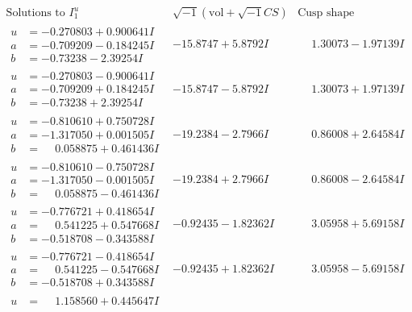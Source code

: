 \documentclass[1p]{elsarticle_modified}
\theoremstyle{definition}
\newcommand{\I}{\sqrt{-1}}
\begin{document}
$$\begin{array}{c|c|c}  
\text{Solutions to }I^u_{1}& \I (\text{vol} + \sqrt{-1}CS) & \text{Cusp shape}\\
 \hline 
\begin{aligned}
u &= -0.270803 + 0.900641 I \\
a &= -0.709209 - 0.184245 I \\
b &= -0.73238 - 2.39254 I\end{aligned}
 & -15.8747 + 5.8792 I & \phantom{-}1.30073 - 1.97139 I \\ \hline\begin{aligned}
u &= -0.270803 - 0.900641 I \\
a &= -0.709209 + 0.184245 I \\
b &= -0.73238 + 2.39254 I\end{aligned}
 & -15.8747 - 5.8792 I & \phantom{-}1.30073 + 1.97139 I \\ \hline\begin{aligned}
u &= -0.810610 + 0.750728 I \\
a &= -1.317050 + 0.001505 I \\
b &= \phantom{-}0.058875 + 0.461436 I\end{aligned}
 & -19.2384 - 2.7966 I & \phantom{-}0.86008 + 2.64584 I \\ \hline\begin{aligned}
u &= -0.810610 - 0.750728 I \\
a &= -1.317050 - 0.001505 I \\
b &= \phantom{-}0.058875 - 0.461436 I\end{aligned}
 & -19.2384 + 2.7966 I & \phantom{-}0.86008 - 2.64584 I \\ \hline\begin{aligned}
u &= -0.776721 + 0.418654 I \\
a &= \phantom{-}0.541225 + 0.547668 I \\
b &= -0.518708 - 0.343588 I\end{aligned}
 & -0.92435 - 1.82362 I & \phantom{-}3.05958 + 5.69158 I \\ \hline\begin{aligned}
u &= -0.776721 - 0.418654 I \\
a &= \phantom{-}0.541225 - 0.547668 I \\
b &= -0.518708 + 0.343588 I\end{aligned}
 & -0.92435 + 1.82362 I & \phantom{-}3.05958 - 5.69158 I \\ \hline\begin{aligned}
u &= \phantom{-}1.158560 + 0.445647 I \\

\end{aligned}
\end{array}$$
\end{document}
